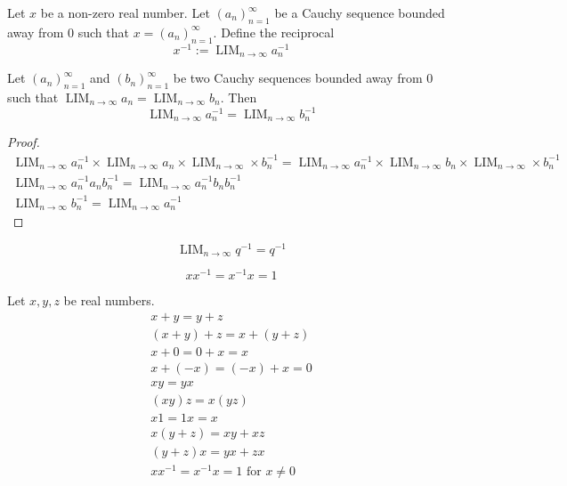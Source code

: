 \documentclass{blog}
\DeclareMathOperator{\LIM}{LIM}
\begin{document}
\begin{definition}[reciprocal]
  Let $x$ be a non-zero real number.
  Let $(a_{n})_{n = 1}^{\infty}$ be a Cauchy sequence bounded away from 0 such that
  $x = (a_{n})_{n = 1}^{\infty}$.
  Define the reciprocal
  \begin{equation}
    x^{-1} := \LIM_{n \to \infty} a_{n}^{-1}
  \end{equation}
\end{definition}

\begin{lemma}
  Let $(a_{n})_{n = 1}^{\infty}$ and $(b_{n})_{n = 1}^{\infty}$
  be two Cauchy sequences bounded away from 0 such that
  $\LIM_{n \to \infty} a_{n} = \LIM_{n \to \infty} b_{n}$.
  Then
  \begin{equation*}
    \LIM_{n \to \infty} a_{n}^{-1} = \LIM_{n \to \infty} b_{n}^{-1}
  \end{equation*}
\end{lemma}

\begin{proof}
  \begin{gather*}
    \LIM_{n \to \infty} a_{n}^{-1} \times \LIM_{n \to \infty} a_{n} \times \LIM_{n \to \infty} \times b_{n}^{-1} =
    \LIM_{n \to \infty} a_{n}^{-1} \times \LIM_{n \to \infty} b_{n} \times \LIM_{n \to \infty} \times b_{n}^{-1} \\
    \LIM_{n \to \infty} a_{n}^{-1} a_{n} b_{n}^{-1} = \LIM_{n \to \infty} a_{n}^{-1} b_{n} b_{n}^{-1} \\
    \LIM_{n \to \infty} b_{n}^{-1} = \LIM_{n \to \infty} a_{n}^{-1}
  \end{gather*}
\end{proof}

\begin{definition}[reciprocal = rational]
  \begin{equation*}
    \LIM_{n \to \infty} q^{-1} = q^{-1}
  \end{equation*}
\end{definition}

\begin{proposition}
  \begin{equation*}
    x x^{-1} = x^{-1} x = 1
  \end{equation*}
\end{proposition}

\begin{proposition}[field]
  Let $x, y, z$ be real numbers.
  \begin{gather}
    x + y = y + z \\
    (x + y) + z = x + (y + z) \\
    x + 0 = 0 + x = x \\
    x + (-x) = (-x) + x = 0 \\
    x y = y x \\
    (x y) z = x (y z) \\
    x 1 = 1 x = x \\
    x (y + z) = x y + x z \\
    (y + z) x = y x + z x \\
    x x^{-1} = x^{-1} x = 1 \text{ for } x \neq 0
  \end{gather}
\end{proposition}
\end{document}
